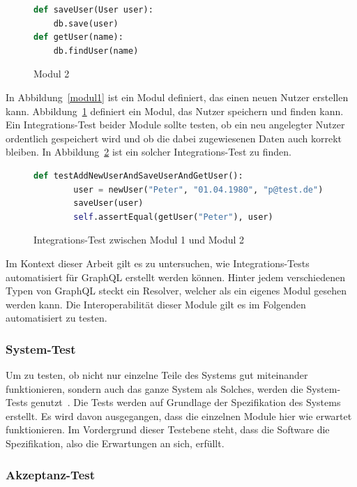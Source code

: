 \begin{figure}[h!]
    \begin{lstlisting}[language=Python]
def saveUser(User user):
    db.save(user)
def getUser(name):
    db.findUser(name)
    \end{lstlisting}
    \caption{Modul 2}
    \label{modul2}
\end{figure}

In Abbildung~\ref{modul1} ist ein Modul definiert, das einen neuen Nutzer erstellen kann.
Abbildung~\ref{modul2} definiert ein Modul, das Nutzer speichern und finden kann.
Ein Integrations-Test beider Module sollte testen, ob ein neu angelegter Nutzer ordentlich gespeichert wird und ob die dabei zugewiesenen Daten auch korrekt bleiben.
In Abbildung~\ref{integtest} ist ein solcher Integrations-Test zu finden.

\begin{figure}[h!]
    \begin{lstlisting}[language=Python]
def testAddNewUserAndSaveUserAndGetUser():
        user = newUser("Peter", "01.04.1980", "p@test.de")
        saveUser(user)
        self.assertEqual(getUser("Peter"), user)
    \end{lstlisting}
    \caption{Integrations-Test zwischen Modul 1 und Modul 2}
    \label{integtest}
\end{figure}

Im Kontext dieser Arbeit gilt es zu untersuchen, wie Integrations-Tests automatisiert für GraphQL erstellt werden können.
Hinter jedem verschiedenen Typen von GraphQL steckt ein Resolver, welcher als ein eigenes Modul gesehen werden kann.
Die Interoperabilität dieser Module gilt es im Folgenden automatisiert zu testen.

\subsubsection{System-Test}

Um zu testen, ob nicht nur einzelne Teile des Systems gut miteinander funktionieren, sondern auch das ganze System als
Solches, werden die System-Tests genutzt~\cite[vgl. S. 6]{software-testing}.
Die Tests werden auf Grundlage der Spezifikation des Systems erstellt.
Es wird davon ausgegangen, dass die einzelnen Module hier wie erwartet funktionieren.
Im Vordergrund dieser Testebene steht, dass die Software die Spezifikation, also die Erwartungen an sich, erfüllt.

\subsubsection{Akzeptanz-Test}

